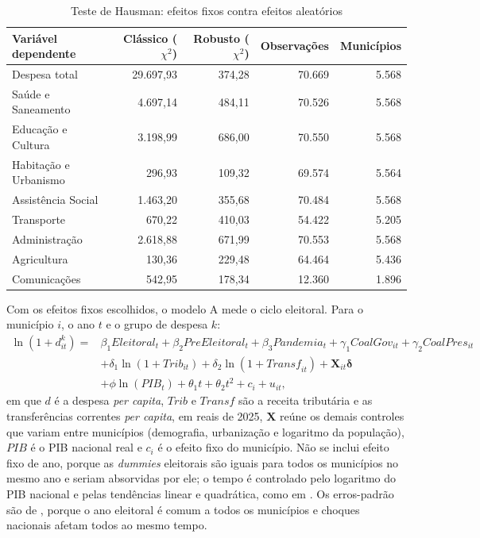 \begin{table}[htbp]
\caption{Teste de Hausman: efeitos fixos contra efeitos aleatórios}\label{tab:hausman}
\footnotesize
\setlength{\tabcolsep}{4pt}
\begin{tabular}{lrrrr}
\hline
\textbf{Variável dependente} & \textbf{Clássico ($\chi^2$)} & \textbf{Robusto ($\chi^2$)} & \textbf{Observações} & \textbf{Municípios} \\ \hline
Despesa total & 29.697,93 & 374,28 & 70.669 & 5.568 \\
Saúde e Saneamento & 4.697,14 & 484,11 & 70.526 & 5.568 \\
Educação e Cultura & 3.198,99 & 686,00 & 70.550 & 5.568 \\
Habitação e Urbanismo & 296,93 & 109,32 & 69.574 & 5.564 \\
Assistência Social & 1.463,20 & 355,68 & 70.484 & 5.568 \\
Transporte & 670,22 & 410,03 & 54.422 & 5.205 \\
Administração & 2.618,88 & 671,99 & 70.553 & 5.568 \\
Agricultura & 130,36 & 229,48 & 64.464 & 5.436 \\
Comunicações & 542,95 & 178,34 & 12.360 & 1.896 \\ \hline
\end{tabular}
\end{table}

Com os efeitos fixos escolhidos, o modelo A mede o ciclo eleitoral. Para o município $i$, o ano $t$ e o grupo de despesa $k$:
\begin{equation}\label{eq:modeloA}
\begin{split}
\ln(1 + d^k_{it}) = {} & \beta_1 \mathit{Eleitoral}_t + \beta_2 \mathit{PreEleitoral}_t + \beta_3 \mathit{Pandemia}_t + \gamma_1 \mathit{CoalGov}_{it} + \gamma_2 \mathit{CoalPres}_{it} \\
& + \delta_1 \ln(1 + \mathit{Trib}_{it}) + \delta_2 \ln(1 + \mathit{Transf}_{it}) + \mathbf{X}_{it}\boldsymbol{\delta} \\
& + \phi \ln(\mathit{PIB}_t) + \theta_1 t + \theta_2 t^2 + c_i + u_{it},
\end{split}
\end{equation}
em que $d$ é a despesa \textit{per capita}, $\mathit{Trib}$ e $\mathit{Transf}$ são a receita tributária e as transferências correntes \textit{per capita}, em reais de 2025, $\mathbf{X}$ reúne os demais controles que variam entre municípios (demografia, urbanização e logaritmo da população), $\mathit{PIB}$ é o PIB nacional real e $c_i$ é o efeito fixo do município. Não se inclui efeito fixo de ano, porque as \textit{dummies} eleitorais são iguais para todos os municípios no mesmo ano e seriam absorvidas por ele; o tempo é controlado pelo logaritmo do PIB nacional e pelas tendências linear e quadrática, como em \textcite{sakurai2009}. Os erros-padrão são de \textcite{driscoll1998}, porque o ano eleitoral é comum a todos os municípios e choques nacionais afetam todos ao mesmo tempo.

